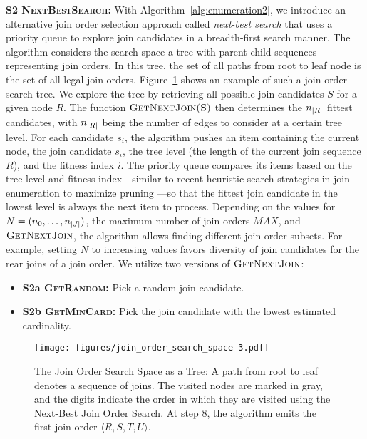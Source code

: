 \textbf{S2 \textsc{NextBestSearch}:} With Algorithm~\ref{alg:enumeration2}, we introduce an alternative join order selection approach called \emph{next-best search} that uses a priority queue to explore join candidates in a breadth-first search manner. The algorithm considers the search space a tree with parent-child sequences representing join orders. In this tree, the set of all paths from root to leaf node is the set of all legal join orders. Figure~\ref{fig:search_space} shows an example of such a join order search tree. We explore the tree by retrieving all possible join candidates $S$ for a given node $R$. The function $\textsc{GetNextJoin(S)}$ then determines the $n_{\lvert R\rvert}$ fittest candidates, with $n_{\lvert R\rvert}$ being the number of edges to consider at a certain tree level. For each candidate $s_i$, the algorithm pushes an item containing the current node, the join candidate $s_i$, the tree level (\ie the length of the current join sequence $R$), and the fitness index $i$. The priority queue compares its items based on the tree level and fitness index---similar to recent heuristic search strategies in join enumeration to maximize pruning \cite{HaffnerD23}---so that the fittest join candidate in the lowest level is always the next item to process. Depending on the values for $N=(n_0, \ldots, n_{\lvert J\rvert})$, the maximum number of join orders $\textit{MAX}$, and $\textsc{GetNextJoin}$, the algorithm allows finding different join order subsets. For example, setting $N$ to increasing values favors diversity of join candidates for the rear joins of a join order. We utilize two versions of $\textsc{GetNextJoin}$:
\begin{itemize}
\item \textbf{S2a \textsc{GetRandom}:} Pick a random join candidate.
\item \textbf{S2b \textsc{GetMinCard}:} Pick the join candidate with the lowest estimated cardinality.
\end{itemize}

\begin{figure}[!t]
    \vspace{-0.1cm}
    \centering
    \texttt{[image: figures/join\_order\_search\_space-3.pdf]}
    \vspace{-0.15cm}
    \caption{The Join Order Search Space as a Tree: A path from root to leaf denotes a sequence of joins. The visited nodes are marked in gray, and the digits indicate the order in which they are visited using the Next-Best Join Order Search. At step 8, the algorithm emits the first join order $\langle R, S, T, U \rangle$.}
    \label{fig:search_space}
    \vspace{-0.35cm}
\end{figure}


